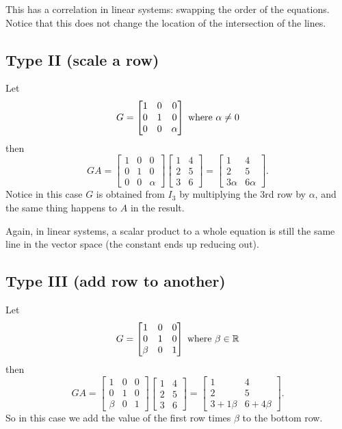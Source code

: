 \begin{aside}
This has a correlation in linear systems: swapping the order of the equations. 
Notice that this does not change the location of the intersection of the lines.
\end{aside}

\subsection{Type II (scale a row)}
Let 
\[G = \left[\begin{matrix}1 & 0 & 0\\ 0 & 1 & 0\\ 0 & 0 & \alpha\end{matrix}\right] \; \textnormal{where }\alpha\ne0\]
then 
\[GA = \left[\begin{matrix}1 & 0 & 0\\ 0 & 1 & 0\\ 0 & 0 & \alpha\end{matrix}\right]\left[\begin{matrix}1 & 4 \\ 2 & 5\\ 3 & 6\end{matrix}\right] = \left[\begin{matrix}1 & 4 \\ 2 & 5\\ 3\alpha & 6\alpha\end{matrix}\right].\]
Notice in this case $G$ is obtained from $I_3$ by multiplying the 3rd row by $\alpha$, 
and the same thing happens to $A$ in the result. 

\begin{aside}
Again, in linear systems, a scalar product to a whole equation is still the same line in the vector space 
(the constant ends up reducing out).
\end{aside}

\subsection{Type III (add row to another)}
Let 
\[G = \left[\begin{matrix}1 & 0 & 0\\ 0 & 1 & 0\\ \beta & 0 & 1\end{matrix}\right] \; \textnormal{where }\beta\in\operatorname{\mathbb{R}}\]
then 
\[GA = \left[\begin{matrix}1 & 0 & 0\\ 0 & 1 & 0\\ \beta & 0 & 1\end{matrix}\right]\left[\begin{matrix}1 & 4 \\ 2 & 5\\ 3 & 6\end{matrix}\right] = \left[\begin{matrix}1 & 4 \\ 2 & 5\\ 3 + 1\beta & 6+4\beta\end{matrix}\right].\]
So in this case we add the value of the first row times $\beta$ to the bottom row. 

